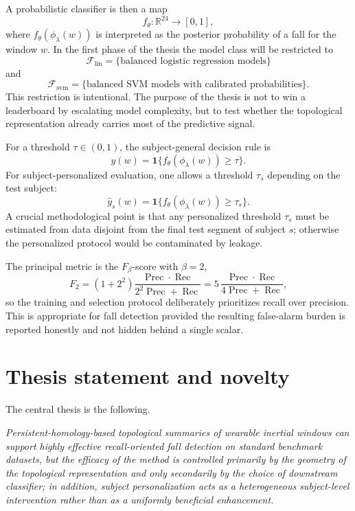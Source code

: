 \documentclass[11pt]{article}
\DeclareMathOperator{\Rec}{Rec}
\DeclareMathOperator{\Prec}{Prec}
\newcommand{\R}{\mathbb R}
\newcommand{\1}{\mathbf 1}
\newcommand{\F}{\mathcal F}
\begin{document}
A probabilistic classifier is then a map
\[
  f_\theta\colon \R^{24}\longrightarrow [0,1],
\]
where $f_\theta(\phi_\lambda(w))$ is interpreted as the posterior probability of a fall for the window $w$. In the first phase of the thesis the model class will be restricted to
\[
  \F_{\mathrm{lin}}=\{\text{balanced logistic regression models}\}
\]
and
\[
  \F_{\mathrm{svm}}=\{\text{balanced SVM models with calibrated probabilities}\}.
\]
This restriction is intentional. The purpose of the thesis is not to win a leaderboard by escalating model complexity, but to test whether the topological representation already carries most of the predictive signal.

For a threshold $\tau\in(0,1)$, the subject-general decision rule is
\[
  \widehat y(w)=\1\{f_\theta(\phi_\lambda(w))\geq \tau\}.
\]
For subject-personalized evaluation, one allows a threshold $\tau_s$ depending on the test subject:
\[
  \widehat y_s(w)=\1\{f_\theta(\phi_\lambda(w))\geq \tau_s\}.
\]
A crucial methodological point is that any personalized threshold $\tau_s$ must be estimated from data disjoint from the final test segment of subject $s$; otherwise the personalized protocol would be contaminated by leakage.

The principal metric is the $F_\beta$-score with $\beta=2$,
\[
  F_2
  =
  (1+2^2)
  \frac{\Prec\cdot\Rec}{2^2\Prec+\Rec}
  =
  5\,\frac{\Prec\cdot\Rec}{4\Prec+\Rec},
\]
so the training and selection protocol deliberately prioritizes recall over precision. This is appropriate for fall detection provided the resulting false-alarm burden is reported honestly and not hidden behind a single scalar.

\section{Thesis statement and novelty}

The central thesis is the following.

\medskip

\emph{Persistent-homology-based topological summaries of wearable inertial windows can support highly effective recall-oriented fall detection on standard benchmark datasets, but the efficacy of the method is controlled primarily by the geometry of the topological representation and only secondarily by the choice of downstream classifier; in addition, subject personalization acts as a heterogeneous subject-level intervention rather than as a uniformly beneficial enhancement.}

\medskip
\end{document}
